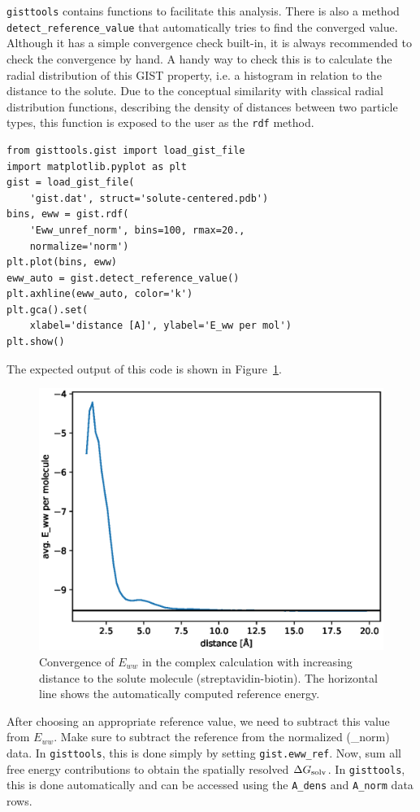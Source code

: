 \documentclass[9pt,tutorial]{livecoms}
\newcommand{\dgsolv}{\Delta G_\textup{solv}}
\newcommand{\software}{\texttt}
\newcommand\inlinecode{\texttt}
\begin{document}
\software{gisttools} contains functions to facilitate this analysis.
There is also a method \inlinecode{detect\_reference\_value} that automatically tries to find the converged value.
Although it has a simple convergence check built-in, it is always recommended to check the convergence by hand. A handy way to check this is to calculate the radial distribution of this GIST property, i.e. a histogram in relation to the distance to the solute. Due to the conceptual similarity with classical radial distribution functions, describing the density of distances between two particle types, this function is exposed to the user as the \inlinecode{rdf} method.

\begin{lstlisting}[style=python]
from gisttools.gist import load_gist_file
import matplotlib.pyplot as plt
gist = load_gist_file(
    'gist.dat', struct='solute-centered.pdb')
bins, eww = gist.rdf(
    'Eww_unref_norm', bins=100, rmax=20.,
    normalize='norm')
plt.plot(bins, eww)
eww_auto = gist.detect_reference_value()
plt.axhline(eww_auto, color='k')
plt.gca().set(
    xlabel='distance [A]', ylabel='E_ww per mol')
plt.show()
\end{lstlisting}
The expected output of this code is shown in Figure~\ref{fig_ewwref}.
\begin{figure}
	\centering
	\includegraphics[width=0.8\linewidth]{figures/Eww_convergence.eps}
	\caption{Convergence of $E_{ww}$ in the complex calculation with increasing distance to the solute molecule (streptavidin-biotin). The horizontal line shows the automatically computed reference energy.}\label{fig_ewwref}
\end{figure}
After choosing an appropriate reference value, we need to subtract this value from $E_{ww}$.
Make sure to subtract the reference from the normalized (\_norm) data.
In \software{gisttools}, this is done simply by setting \inlinecode{gist.eww\_ref}.
Now, sum all free energy contributions to obtain the spatially resolved $\dgsolv$.
In \software{gisttools}, this is done automatically and can be accessed using the \inlinecode{A\_dens} and \inlinecode{A\_norm} data rows.
\end{document}
